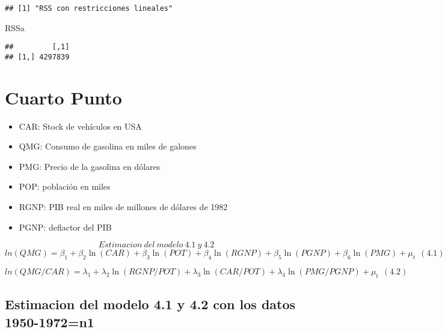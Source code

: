 \documentclass[
]{article}
\newenvironment{Shaded}{\begin{snugshade}}{\end{snugshade}}
\newcommand{\CommentTok}[1]{\textcolor[rgb]{0.56,0.35,0.01}{\textit{#1}}}
\newcommand{\KeywordTok}[1]{\textcolor[rgb]{0.13,0.29,0.53}{\textbf{#1}}}
\newcommand{\NormalTok}[1]{#1}
\newcommand{\OperatorTok}[1]{\textcolor[rgb]{0.81,0.36,0.00}{\textbf{#1}}}
\newcommand{\StringTok}[1]{\textcolor[rgb]{0.31,0.60,0.02}{#1}}
\providecommand{\tightlist}{%
  \setlength{\itemsep}{0pt}\setlength{\parskip}{0pt}}
\begin{document}
\begin{Shaded}
\end{Shaded}

\begin{verbatim}
## [1] "RSS con restricciones lineales"
\end{verbatim}

\begin{Shaded}
\begin{Highlighting}[]
\NormalTok{RSSa}
\end{Highlighting}
\end{Shaded}

\begin{verbatim}
##         [,1]
## [1,] 4297839
\end{verbatim}

\hypertarget{cuarto-punto}{%
\section{Cuarto Punto}\label{cuarto-punto}}

\begin{itemize}
\tightlist
\item
  CAR: Stock de vehículos en USA
\item
  QMG: Consumo de gasolina en miles de galones
\item
  PMG: Precio de la gasolina en dólares
\item
  POP: población en miles
\item
  RGNP: PIB real en miles de millones de dólares de 1982
\item
  PGNP: deflactor del PIB
\end{itemize}

\[Estimacion\ del \ modelo\ 4.1\ y \ 4.2\]
\[ln(QMG)=\beta_1+\beta_2\ln(CAR)+\beta_3\ln(POT)+\beta_4\ln(RGNP)+\beta_5\ln(PGNP)+\beta_6\ln(PMG)+\mu_t\  \ (4.1)\]

\[ln(QMG/CAR)=\lambda_1+\lambda_2\ln(RGNP/POT)+\lambda_3\ln(CAR/POT)+\lambda_4\ln(PMG/PGNP)+\mu_t\  \ (4.2)\]

\hypertarget{estimacion-del-modelo-4.1-y-4.2-con-los-datos-1950-1972n1}{%
\subsection{Estimacion del modelo 4.1 y 4.2 con los datos
1950-1972=n1}\label{estimacion-del-modelo-4.1-y-4.2-con-los-datos-1950-1972n1}}
\end{document}
